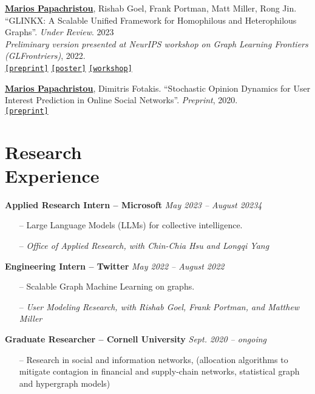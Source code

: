 \documentclass[margin]{res}
\newcommand{\specialurl}[2]{\href {#2} {\texttt{[#1]}}}
\newcommand{\preprint}[1]{\specialurl {preprint} {#1}}
\newcommand{\poster}[1]{\specialurl {poster} {#1}}
\newcommand{\workshop}[1]{\specialurl {workshop} {#1}}
\newcommand{\authorref}[1]{\underline {\textbf{#1}}}
\newcommand{\authorme}{\authorref{Marios Papachristou}}
\begin{document}
\begin{resume}
\begin{enumerate}[nosep, label={[W\arabic*]}]
   \item \authorme, Rishab Goel, Frank Portman, Matt Miller, Rong Jin. ``GLINKX: A Scalable Unified Framework for Homophilous and Heterophilous Graphs''. \emph{Under Review}. 2023 \\\emph{Preliminary version presented at NeurIPS workshop on Graph Learning Frontiers (GLFrontriers)}, 2022. \\ \preprint{https://arxiv.org/abs/2211.00550} \poster{https://drive.google.com/file/d/14LwkvoH7sUe6qGvINGqTuMSHid16J3Av/view?usp=share_link} \workshop{https://openreview.net/forum?id=GlViaJSwnlK}
    \item \authorme, Dimitris Fotakis. ``Stochastic Opinion Dynamics for User Interest Prediction in Online Social Networks''.  \emph{Preprint}, 2020. \\ \preprint{https://www.researchgate.net/publication/353006940_Stochastic_Opinion_Dynamics_for_Interest_Prediction_in_Social_Networks}
\end{enumerate}


\section{Research \\ Experience}

 \textbf{Applied Research Intern -- Microsoft} \hfill \emph{May 2023 -- August 20234}

\begin{itemize}[nosep]
	\item[--] Large Language Models (LLMs) for collective intelligence. 	
	\item[--] \emph{Office of Applied Research, with Chin-Chia Hsu and Longqi Yang}
\end{itemize}


\textbf{Engineering Intern -- Twitter} \hfill \emph{May 2022 -- August 2022}
\begin{itemize}[nosep]
\item[--] Scalable Graph Machine Learning on graphs. 
\item[--] \emph{User Modeling Research, with Rishab Goel, Frank Portman, and Matthew Miller}
\end{itemize}

\textbf{Graduate Researcher -- Cornell University} \hfill \emph{Sept. 2020 -- ongoing}
\begin{itemize}[nosep]
	\item[--] Research in social and information networks, (allocation algorithms to mitigate contagion in financial and supply-chain networks, statistical graph and hypergraph models)
\end{itemize}



\end{resume}
\end{document}
